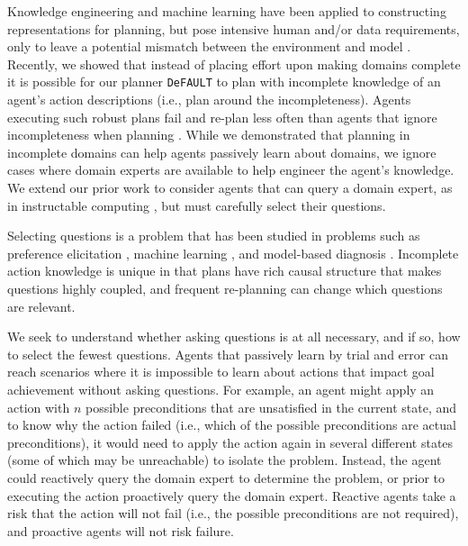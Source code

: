 \documentclass[letterpaper]{article}
\def\citep#1{\cite{#1}}
\def\default{{\tt DeFAULT}}
\begin{document}
Knowledge engineering \citep{ickeps09} and machine learning
\citep{arms,DBLP:conf/aaai/OatesC96} have been applied to constructing
representations for planning, but pose intensive human and/or data requirements,
only to leave a potential mismatch between the environment and model
\citep{modellite}.  Recently, we \cite{bryce-icaps11} showed that instead of
placing effort upon making domains complete it is possible for our planner
\default{} to plan with incomplete knowledge of an agent's action descriptions
(i.e., plan around the incompleteness).  Agents executing such robust plans fail and re-plan less often
 than agents that ignore
incompleteness when planning \citep{DBLP:conf/aips/ChangA06}.  While
we demonstrated that planning in incomplete domains can
help agents passively learn about domains, we ignore cases where domain
experts are available to help engineer the agent's knowledge.  We extend our
prior work \citep{bryce-icaps11} to
consider agents that can query a domain expert, as in instructable computing
\citep{mable}, but must carefully select their questions.

Selecting questions is a problem that has been studied in problems such as
preference elicitation \citep{DBLP:conf/aaai/Boutilier02}, machine learning
\citep{AICPub1812:2011}, and model-based diagnosis
\citep{deKleer:1992:CDS:140524.140531}.  
Incomplete action knowledge is unique in that plans have rich causal structure
that makes questions highly coupled, and frequent re-planning can change which
questions are relevant.  


We seek to understand whether asking questions is at all necessary, and if so,
how to select the fewest questions.  Agents that passively learn by trial and
error can reach scenarios where it is impossible to learn about actions that impact goal
achievement without asking questions. For example, an agent might apply an
action with $n$ possible preconditions that are unsatisfied in the current
state, and to know why the action failed (i.e., which of the possible
preconditions are actual preconditions), it would need to apply the action again in 
several different states (some of which may be unreachable) to isolate the
problem. Instead, the agent could reactively query the domain expert to determine the problem, or prior to
executing the action proactively query the domain expert.  Reactive agents take
a risk that  the action will not fail (i.e., the possible preconditions
are not required), and proactive agents will not risk failure.  
\end{document}
